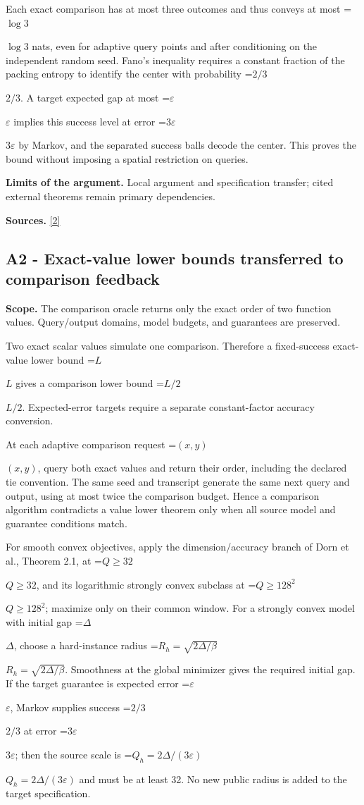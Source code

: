 \documentclass[10pt,a4paper]{article}
\newcommand{\AtlasMath}[1]{\par\begingroup\centering\setbox0=\hbox{$\displaystyle #1$}\ifdim\wd0>1.4\linewidth\typeout{ATLAS WIDE FORMULA: \the\wd0}\fi\ifdim\wd0>\linewidth\resizebox{\linewidth}{!}{\box0}\else\box0\fi\par\endgroup}
\newcommand{\AtlasInlineMath}[1]{\begingroup\setbox0=\hbox{$#1$}\ifdim\wd0>.4\linewidth\endgroup\AtlasMath{#1}\else\endgroup$#1$\fi}
\begin{document}
Each exact comparison has at most three outcomes and thus conveys at most \AtlasInlineMath{\log3} nats, even for adaptive query points and after conditioning on the independent random seed. Fano's inequality requires a constant fraction of the packing entropy to identify the center with probability \AtlasInlineMath{2/3}. A target expected gap at most \AtlasInlineMath{\varepsilon} implies this success level at error \AtlasInlineMath{3\varepsilon} by Markov, and the separated success balls decode the center. This proves the bound without imposing a spatial restriction on queries.

\textbf{Limits of the argument.} Local argument and specification transfer; cited external theorems remain primary dependencies.

\textbf{Sources.} \href{https://papers.nips.cc/paper_files/paper/2012/file/e6d8545daa42d5ced125a4bf747b3688-Paper.pdf}{[2]}

\subsection{A2 - Exact-value lower bounds transferred to comparison feedback}
\textbf{Scope.} The comparison oracle returns only the exact order of two function values. Query/output domains, model budgets, and guarantees are preserved.

Two exact scalar values simulate one comparison. Therefore a fixed-success exact-value lower bound \AtlasInlineMath{L} gives a comparison lower bound \AtlasInlineMath{L/2}. Expected-error targets require a separate constant-factor accuracy conversion.

At each adaptive comparison request \AtlasInlineMath{(x,y)}, query both exact values and return their order, including the declared tie convention. The same seed and transcript generate the same next query and output, using at most twice the comparison budget. Hence a comparison algorithm contradicts a value lower theorem only when all source model and guarantee conditions match.

For smooth convex objectives, apply the dimension/accuracy branch of Dorn et al., Theorem 2.1, at \AtlasInlineMath{Q\ge32}, and its logarithmic strongly convex subclass at \AtlasInlineMath{Q\ge128^2}; maximize only on their common window. For a strongly convex model with initial gap \AtlasInlineMath{\Delta}, choose a hard-instance radius \AtlasInlineMath{R_h=\sqrt{2\Delta/\beta}}. Smoothness at the global minimizer gives the required initial gap. If the target guarantee is expected error \AtlasInlineMath{\varepsilon}, Markov supplies success \AtlasInlineMath{2/3} at error \AtlasInlineMath{3\varepsilon}; then the source scale is \AtlasInlineMath{Q_h=2\Delta/(3\varepsilon)} and must be at least 32. No new public radius is added to the target specification.
\end{document}
